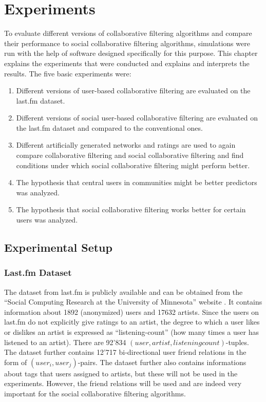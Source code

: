 \chapter{Experiments}
\label{c:experiments} To evaluate different versions of collaborative filtering algorithms and compare their performance to social collaborative filtering algorithms, simulations were run with the help of software designed specifically for this purpose. This chapter explains the experiments that were conducted and explains and interprets the results. The five basic experiments were:

\begin{enumerate}
\item Different versions of user-based collaborative filtering are evaluated on the last.fm dataset.
\item Different versions of social user-based collaborative filtering are evaluated on the last.fm dataset and compared to the conventional ones.
\item Different artificially generated networks and ratings are used to again compare collaborative filtering and social collaborative filtering and find conditions under which social collaborative filtering might perform better.
\item The hypothesis that central users in communities might be better predictors was analyzed.
\item The hypothesis that social collaborative filtering works better for certain users was analyzed.
\end{enumerate}

\section{Experimental Setup}
\label{st:experimentalsetup}

\subsection{Last.fm Dataset}
\label{sst:lastfmdataset} The dataset from last.fm is publicly available and can be obtained from the ``Social Computing Research at the University of Minnesota'' website \cite{Grouplens}. It contains information about 1892 (anonymized) users and 17632 artists. Since the users on last.fm do not explicitly give ratings to an artist, the degree to which a user likes or dislikes an artist is expressed as ``listening-count'' (how many times a user has listened to an artist). There are 92'834 $(user, artist, listeningcount)$-tuples. The dataset further contains 12'717 bi-directional user friend relations in the form of $(user_i, user_j)$-pairs. The dataset further also contains informations about tags that users assigned to artists, but these will not be used in the experiments. However, the friend relations will be used and are indeed very important for the social collaborative filtering algorithms.

